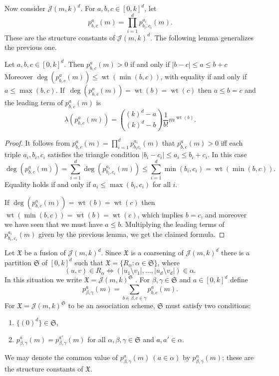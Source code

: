 \documentclass[ALCO]{cedram}
\newcommand{\cJ}{{\mathcal J}}
\newcommand{\fS}{\mathfrak S}
\newcommand{\wt}{\operatorname{wt}}
\def\X{\mathfrak{X}}
\begin{document}
Now consider $\cJ(m, k)^d$.
For $a, b, c \in [0,k]^d$, let
\[
    p^a_{b,c}(m) = \prod_{i=1}^d p^{a_i}_{b_i,c_i}(m).
\]
These are the structure constants of $\cJ(m, k)^d$.
The following lemma generalizes the previous one.

\begin{lemma}
    Let $a,b,c\in[0,k]^d$.
    Then $p^a_{b,c}(m) > 0$ if and only if $|b-c| \leq a \leq b + c$
    Moreover $\deg(p_{b,c}^a(m)) \leq \wt(\min(b, c))$, with equality if and only if $a \leq \max(b, c)$.
    If~$\deg(p_{b,c}^a(m)) = \wt(b) = \wt(c)$ then $a \leq b = c$ and the leading term of $p^a_{b,c}(m)$ is
    \[
        \lambda(p^a_{b,c}(m))
        = \binom{(k)^d - a}{(k)^d - b} \frac{1}{b!} m^{\wt(b)}.
    \]
\end{lemma}
\begin{proof}
    It follows from $p_{b,c}^a(m) = \prod_{i=1}^d p_{b_i c_i}^{a_i}(m)$ that $p_{b,c}^a(m)>0$ iff each triple $a_i,b_i,c_i$ satisfies the triangle condition $|b_i-c_i|\leq a_i \leq b_i+c_i$. In this case
    \[
        \deg(p_{b,c}^a(m)) = \sum_{i=1}^d \deg(p_{b_i, c_i}^{a_i}(m))\leq \sum_{i=1}^d\min(b_i,c_i) = \wt(\min(b, c)).
    \]
    Equality holds if and only if $a_i \leq \max(b_i, c_i)$ for all $i$.
    
    If $\deg(p_{b,c}^a(m)) = \wt(b) = \wt(c)$ then $\wt(\min(b, c)) = \wt(b) = \wt(c)$, which implies $b = c$, and moreover we have seen that we must have $a \leq b$.
    Multiplying the leading terms of $p^{a_i}_{b_i,c_i}(m)$ given by the previous lemma, we get the claimed formula.
\end{proof}


Let $\X$ be a fusion of $\cJ(m, k)^d$.
Since $\X$ is a coarsening of $\cJ(m, k)^d$ there is a partition $\fS$ of $[0,k]^d$ such that $\X = \{R_\alpha : \alpha \in \fS\}$, where
\[
    (u, v) \in R_\alpha \iff (|u_1 \setminus v_1|, \dots, |u_d \setminus v_d|) \in \alpha.
\]
In this situation we write $\X = \cJ(m, k)^\fS$ \cite[Section~4]{E}.
For $\beta, \gamma \in \fS$ and $a \in [0,k]^d$ define
\[
    p^a_{\beta,\gamma}(m) = \sum_{b\in \beta, c \in \gamma} p^a_{b,c}(m).
\]
For $\X = \cJ(m,k)^\fS$ to be an association scheme, $\fS$ must satisfy two conditions:
\begin{enumerate}
    \item $\{(0)^d\} \in \fS$,
    \item $p^a_{\beta,\gamma}(m) = p^{a'}_{\beta,\gamma}(m)$ for all $\alpha,\beta,\gamma \in \fS$ and $a,a' \in \alpha$.
\end{enumerate}
We may denote the common value of $p^a_{\beta,\gamma}(m) ~ (a\in\alpha)$ by $p^\alpha_{\beta,\gamma}(m)$; these are the structure constants of $\X$.
\end{document}
